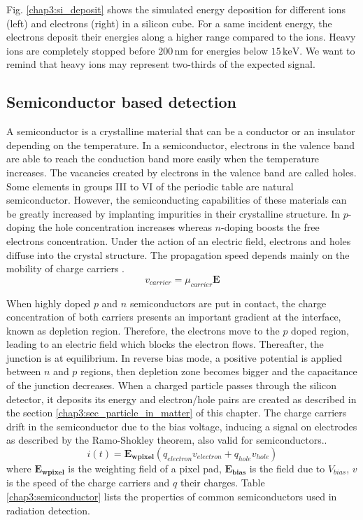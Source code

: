 \begin{refsection}
  

  Fig. \ref{chap3:si_deposit} shows the simulated energy deposition for different ions (left) and electrons (right) in a silicon cube. For a same incident energy, the electrons deposit their energies along a higher range compared to the ions. Heavy ions are completely stopped before $200\,\mathrm{nm}$ for energies below $15\,\mathrm{keV}$. We want to remind that heavy ions may represent two-thirds of the expected signal.

  \subsection{Semiconductor based detection}
  A semiconductor is a crystalline material that can be a conductor or an insulator depending on the temperature. In a semiconductor, electrons in the valence band are able to reach the conduction band more easily when the temperature increases. The vacancies created by electrons in the valence band are called holes. Some elements in groups III to VI of the periodic table are natural semiconductor. However, the semiconducting capabilities of these materials can be greatly increased by implanting impurities in their crystalline structure. In $p$-doping the hole concentration increases whereas $n$-doping boosts the free electrons concentration. Under the action of an electric field, electrons and holes diffuse into the crystal structure. The propagation speed depends mainly on the mobility of charge carriers \mu.
  \begin{equation}
    v_{carrier} =  \mu_{carrier} \boldsymbol{E}
  \end{equation}

  
  When highly doped $p$ and $n$ semiconductors are put in contact, the charge concentration of both carriers presents an important gradient at the interface, known as depletion region. Therefore, the electrons move to the $p$ doped region, leading to an electric field which blocks the electron flows. Thereafter, the junction is at equilibrium. In reverse bias mode, a positive potential is applied between $n$ and $p$ regions, then depletion zone becomes bigger and the capacitance of the junction decreases. When a charged particle passes through the silicon detector, it deposits its energy and electron/hole pairs are created as described in the section \ref{chap3:sec_particle_in_matter} of this chapter. The charge carriers drift in the semiconductor due to the bias voltage, inducing a signal on electrodes as described by the Ramo-Shokley theorem, also valid for semiconductors.\cite{Cavalleri1971}.
  \begin{equation}
    i(t) =  \boldsymbol{E_{wpixel}} \left( q_{electron} v_{electron}  + q_{hole} v_{hole} \right)
  \end{equation}
  where $\boldsymbol{E_{wpixel}}$ is the weighting field of a pixel pad, $\boldsymbol{E_{bias}}$ is the field due to $V_{bias}$, $v$ is the speed of the charge carriers and $q$ their charges. Table \ref{chap3:semiconductor} lists the properties of common semiconductors used in radiation detection.
  


\end{refsection}
